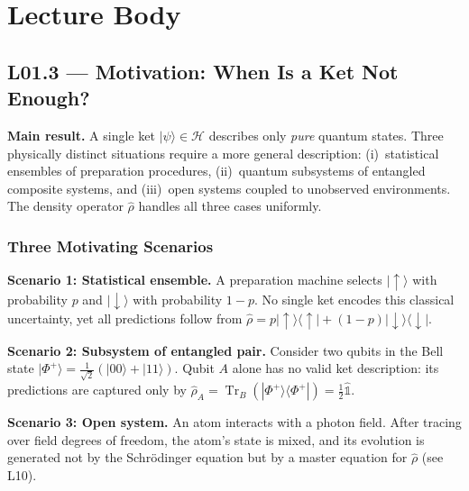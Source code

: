 \documentclass[11pt,a4paper]{article}
\begin{document}
\newpage
\section{Lecture Body}
\label{sec:L01.3}

\subsection{L01.3 --- Motivation: When Is a Ket Not Enough?}
\label{sec:L01.3.1}

\begin{tcolorbox}[goldbox]
\textbf{Main result.}
A single ket $|\psi\rangle\in\mathcal{H}$ describes only \emph{pure} quantum
states. Three physically distinct situations require a more general description:
(i)~statistical ensembles of preparation procedures, (ii)~quantum subsystems of
entangled composite systems, and (iii)~open systems coupled to unobserved environments.
The density operator $\hat{\rho}$ handles all three cases uniformly.
\end{tcolorbox}

\subsubsection*{Three Motivating Scenarios}

\textbf{Scenario 1: Statistical ensemble.}
A preparation machine selects $|\uparrow\rangle$ with probability $p$ and
$|\downarrow\rangle$ with probability $1-p$.
No single ket encodes this classical uncertainty, yet all predictions follow
from $\hat{\rho}=p|\uparrow\rangle\langle\uparrow|+(1-p)|\downarrow\rangle\langle\downarrow|$.

\textbf{Scenario 2: Subsystem of entangled pair.}
Consider two qubits in the Bell state
$|\Phi^+\rangle=\tfrac{1}{\sqrt{2}}(|00\rangle+|11\rangle)$.
Qubit $A$ alone has no valid ket description: its predictions are captured only
by $\hat{\rho}_A=\operatorname{Tr}_B(|\Phi^+\rangle\langle\Phi^+|)=\tfrac{1}{2}\hat{\mathbb{1}}$.

\textbf{Scenario 3: Open system.}
An atom interacts with a photon field. After tracing over field degrees of
freedom, the atom's state is mixed, and its evolution is generated not by the
Schr\"odinger equation but by a master equation for $\hat{\rho}$ (see L10).
\end{document}
